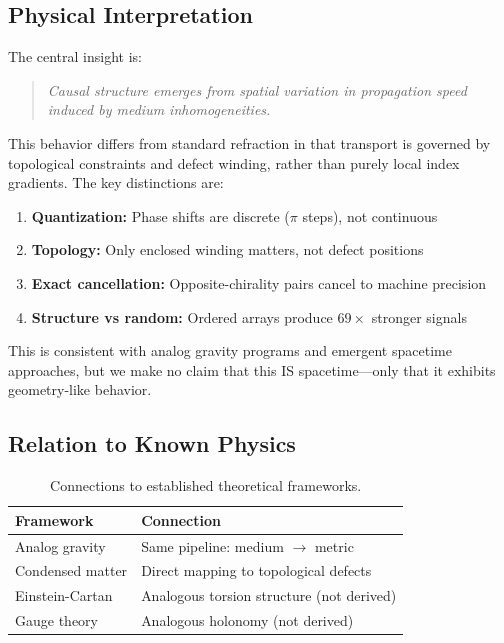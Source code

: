 \documentclass[11pt,a4paper]{article}
\begin{document}
\subsection{Physical Interpretation}

The central insight is:

\begin{quote}
\textit{Causal structure emerges from spatial variation in propagation speed induced by medium inhomogeneities.}
\end{quote}

This behavior differs from standard refraction in that transport is governed by topological constraints and defect winding, rather than purely local index gradients. The key distinctions are:

\begin{enumerate}
    \item \textbf{Quantization:} Phase shifts are discrete ($\pi$ steps), not continuous
    \item \textbf{Topology:} Only enclosed winding matters, not defect positions
    \item \textbf{Exact cancellation:} Opposite-chirality pairs cancel to machine precision
    \item \textbf{Structure vs random:} Ordered arrays produce $69\times$ stronger signals
\end{enumerate}

This is consistent with analog gravity programs and emergent spacetime approaches, but we make no claim that this IS spacetime---only that it exhibits geometry-like behavior.

\subsection{Relation to Known Physics}

\begin{table}[H]
\centering
\begin{tabular}{ll}
\toprule
\textbf{Framework} & \textbf{Connection} \\
\midrule
Analog gravity & Same pipeline: medium $\to$ metric \\
Condensed matter & Direct mapping to topological defects \\
Einstein-Cartan & Analogous torsion structure (not derived) \\
Gauge theory & Analogous holonomy (not derived) \\
\bottomrule
\end{tabular}
\caption{Connections to established theoretical frameworks.}
\label{tab:connections}
\end{table}
\end{document}
